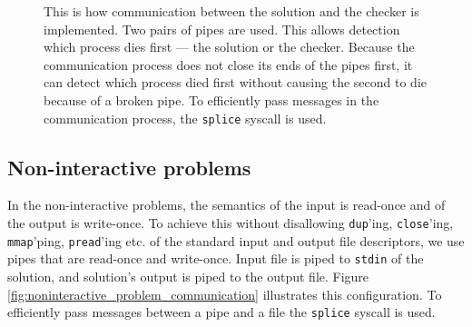 \documentclass[en]{pracamgr}
\begin{document}
\begin{figure}[h]
\tikzset{>=latex} %
\centering
{}
\caption{This is how communication between the solution and the checker is implemented. Two pairs of pipes are used. This allows detection which process dies first --- the solution or the checker. Because the communication process does not close its ends of the pipes first, it can detect which process died first without causing the second to die because of a broken pipe. To efficiently pass messages in the communication process, the \texttt{splice} syscall is used.}
\label{fig:interactive_problem_real_communication}
\end{figure}

\subsection{Non-interactive problems}

In the non-interactive problems, the semantics of the input is read-once and of the output is write-once. To achieve this without disallowing \texttt{dup}'ing, \texttt{close}'ing, \texttt{mmap}'ping, \texttt{pread}'ing etc. of the standard input and output file descriptors, we use pipes that are read-once and write-once. Input file is piped to \texttt{stdin} of the solution, and solution's output is piped to the output file. Figure \ref{fig:noninteractive_problem_communication} illustrates this configuration. To efficiently pass messages between a pipe and a file the \texttt{splice} syscall is used.
\end{document}
